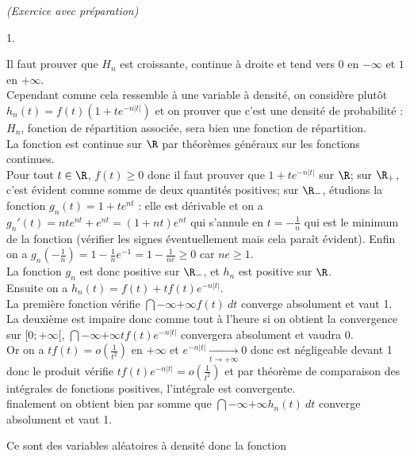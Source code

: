 \documentclass[11pt]{article}%
\begin{document}
\begin{exercice}{\it (Exercice avec préparation)}
\begin{noliste}{1.}
  \item Il faut prouver que $H_{n}$ est croissante, continue à
    droite et tend vers 0 en $-\infty$ et $1$ en $ + \infty$.\\
    Cependant comme cela ressemble à une variable à densité, on
    considère plutôt $h_{n} (t) = f(t) ( 1 + t e^{- n | t |})$ et on
    prouver que c'est une densité de probabilité : $H_{n}$, fonction
    de répartition
    associée, sera bien une fonction de répartition. \\
    La fonction est continue sur $\R$ par théorèmes généraux sur les
    fonctions continues. \\
    Pour tout $t \in \R$, $f(t) \geq 0$ donc il faut prouver que $ 1 +
    t e^{- n | t |}$ sur $\R$; sur $\R_+ $, c'est évident comme somme
    de deux quantités positives; sur $\R_-$, étudions la fonction
    $g_{n}(t) = 1 + t e^{n t}$ : elle est dérivable et on a $g_{n}'(t)
    = n t e^{n t } + e^{nt} = ( 1 + nt) e^{nt} $ qui s'annule en $t =
    - \frac{1}{n }$ qui est le minimum de la fonction (vérifier les
    signes éventuellement mais cela paraît évident). Enfin on a $g_{n}
    \left( - \frac{1}{n} \right) =
    1 - \frac{1}{n} e^{-1} = 1 - \frac{1}{n e} \geq 0$ car $ ne \geq 1$. \\
    La fonction $g_{n}$ est donc positive sur $\R_-$, et $h_{n}$ est
    positive sur $\R$.  \\
    Ensuite on a $h_{n} (t) = f(t) + t f(t) e^{-n | t |}$. \\
    La première fonction vérifie $\dint{-\infty}{+ \infty} f(t)\ dt $
    converge absolument et vaut 1. \\
    La deuxième est impaire donc comme tout à l'heure si on obtient la
    convergence sur $[ 0 ; + \infty[$, $\dint{-\infty}{+ \infty} t
    f(t)
    e^{-n | t |}$ convergera absolument et vaudra 0. \\
    Or on a $t f(t) = o \left( \frac{ 1}{t^{2}} \right)$ en $ +
    \infty$ et $e^{-n | t |} \xrightarrow[ t \rightarrow + \infty]{}
    0$ donc est négligeable devant 1 donc le produit vérifie $t f(t)
    e^{-n | t |} = o \left( \frac{ 1}{t^{2}} \right)$ et par théorème
    de comparaison des
    intégrales de fonctions positives, l'intégrale est convergente. \\
    finalement on obtient bien par somme que $\dint{-\infty}{+ \infty}
    h_{n} (t)\ dt$ converge absolument et vaut 1. \\
  \item Ce sont des variables aléatoires à densité donc la fonction

\end{noliste}
\end{exercice}
\end{document}
